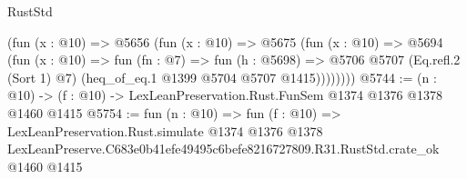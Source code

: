 \begin{lexlean}{RustStd}
\begin{coremodule}
          (fun (x : @10) =>
          @5656
            (fun (x : @10) =>
            @5675
              (fun (x : @10) =>
              @5694
                (fun (x : @10) =>
                fun (fn : @7) =>
                fun (h : @5698) =>
                @5706 @5707 (Eq.refl.{2} (Sort 1) @7) (heq_of_eq.{1} @1399 @5704 @5707 @1415))))))))
@5744 := (n : @10) -> (f : @10) -> LexLeanPreservation.Rust.FunSem @1374 @1376 @1378 @1460 @1415
@5754 := fun (n : @10) =>
  fun (f : @10) =>
  LexLeanPreservation.Rust.simulate
    @1374
    @1376
    @1378
    LexLeanPreserve.C683e0b41efe49495c6befe8216727809.R31.RustStd.crate_ok
    @1460
    @1415
\end{coremodule}
\end{lexlean}
